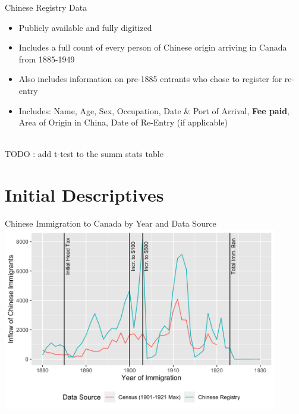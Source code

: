 \documentclass[pdf]{beamer}
\begin{document}
\begin{frame}{Chinese Registry Data}
    \centering
    \begin{itemize}
        \item Publicly available and fully digitized
        \item Includes a full count of every person of Chinese origin arriving in Canada from 1885-1949
        \item Also includes information on pre-1885 entrants who chose to register for re-entry 
        \item Includes: Name, Age, Sex, Occupation, Date \& Port of Arrival, \textbf{Fee paid}, Area of Origin in China, Date of Re-Entry (if applicable) 
    \end{itemize}
    \hyperlink{summstats}{} \\ 
    TODO : add t-test to the summ stats table 
\end{frame}


\section{Initial Descriptives}
\begin{frame}[label = yrimmchi]{Chinese Immigration to Canada by Year and Data Source}
    \centering
    \includegraphics[width = 0.9\textwidth]{../../figs/yrimmchi_maxes.png}
    \hyperlink{taxespaid}{}
    \hyperlink{taxbyyear}{}
    \hyperlink{dateimmchi}{}
    \hyperlink{yrimmchi_means}{}
    \hyperlink{events1912}{}
\end{frame}
\end{document}

